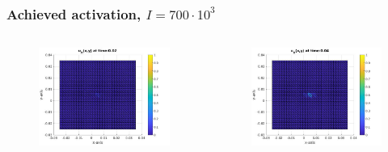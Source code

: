 \documentclass[8pt]{beamer}
\begin{document}
\begin{frame}
	\frametitle{Achieved activation, $I = 700\cdot 10^3$}
	\begin{columns}
		\begin{column}{0.25\textwidth}
			\begin{figure}[h]
				\includegraphics[width=\textwidth]{tc1-2/002.jpg}
			\end{figure}
		\end{column}
		\begin{column}{0.25\textwidth}
			\begin{figure}[h]
				\includegraphics[width=\textwidth]{tc1-2/004.jpg}
			\end{figure}
		\end{column}

\end{columns}
\end{frame}
\end{document}
